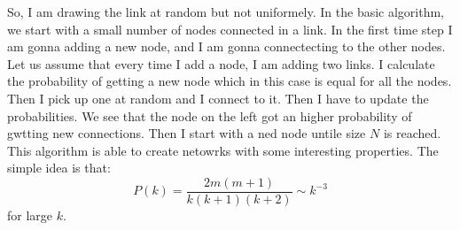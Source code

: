 \documentclass[../main/main.tex]{subfiles}
\begin{document}
So, I am drawing the link at random but not uniformely. In the basic algorithm, we start with a small number of nodes connected in a link. In the first time step I am gonna adding a new node, and I am gonna connectecting to the other nodes. Let us assume that every time I add a node, I am adding two links. I calculate the probability of getting a new node which in this case is equal for all the nodes. Then I pick up one at random and I connect to it. Then I have to update the probabilities. We see that the node on the left got an higher probability of gwtting new connections. Then I start with a ned node untile size \( N \) is reached. This algorithm is able to create netowrks with some interesting properties. The simple idea is that:
\begin{equation*}
  P(k) = \frac{2 m (m +1)}{k(k+1)(k+2)} \sim k^{-3}
\end{equation*}
for large \( k \). 
\end{document}
